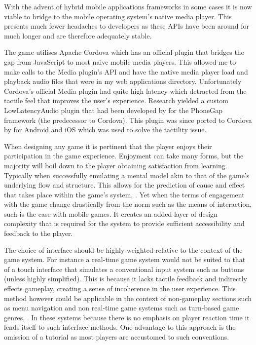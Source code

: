 \documentclass[final]{cmpreport}
\begin{document}

With the advent of hybrid mobile applications frameworks in some cases it is now viable to bridge to the mobile operating system's native media player. This presents much fewer headaches to developers as these APIs have been around for much longer and are therefore adequately stable.

The game utilises Apache Cordova which has an official plugin that bridges the gap from JavaScript to most naive mobile media players. This allowed me to make calls to the Media plugin's API and have the native media player load and playback audio files that were in my web applications directory. Unfortunately Cordova's official Media plugin had quite high latency which detracted from the tactile feel that improves the user's experience. Research yielded a custom LowLatencyAudio plugin that had been developed by \citep{Trice} for the PhoneGap framework (the predecessor to Cordova). This plugin was since ported to Cordova by \citep{Xie} for Android and iOS which was used to solve the tactility issue.

When designing any game it is pertinent that the player enjoys their participation in the game experience. Enjoyment can take many forms, but the majority will boil down to the player obtaining satisfaction from learning. Typically when successfully emulating a mental model akin to that of the game's underlying flow and structure. This allows for the prediction of cause and effect that takes place within the game's system, \cite{Cook}. Yet when the terms of engagement with the game change drastically from the norm such as the means of interaction, such is the case with mobile games. It creates an added layer of design complexity that is required for the system to provide sufficient accessibility and feedback to the player.

The choice of interface should be highly weighted relative to the context of the game system. For instance a real-time game system would not be suited to that of a touch interface that simulates a conventional input system such as buttons (unless highly simplified). This is because it lacks tactile feedback and indirectly effects gameplay, creating a sense of incoherence in the user experience. This method however could be applicable in the context of non-gameplay sections such as menu navigation and non real-time game systems such as turn-based game genres, \cite{XuBradburn}. In these systems because there is no emphasis on player reaction time it lends itself to such interface methods. One advantage to this approach is the omission of a tutorial as most players are accustomed to such conventions.
\end{document}
